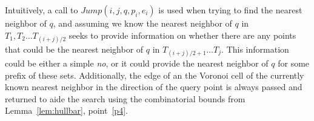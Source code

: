 \documentclass[12pt,a4paper,USenglish,cleveref, autoref, thm-restate]{article}
\newcommand{\ovar}[1]{\overrightarrow{#1}}
\newcommand{\Cell}{\mathit{Cell}}
\newcommand{\NN}{\mathit{NN}}
\newcommand{\john}[1]{\textcolor{red}{#1}}
\newcommand{\yakov}[1]{\textcolor{blue}{Yakov: #1}}
\newcommand{\ovar}[1]{\overrightarrow{#1}}
\newcommand{\Cell}{\mathit{Cell}}
\newcommand{\NN}{\mathit{NN}}
\newcommand{\john}[1]{\textcolor{red}{#1}}
\newcommand{\yakov}[1]{\textcolor{blue}{Yakov: #1}}
\newcommand{\ovar}[1]{\overrightarrow{#1}}
\newcommand{\Cell}{\mathit{Cell}}
\newcommand{\NN}{\mathit{NN}}
\newcommand{\john}[1]{\textcolor{red}{#1}}
\newcommand{\yakov}[1]{\textcolor{blue}{Yakov: #1}}
\begin{document}
Intuitively, a call to $Jump(i,j,q,p_i,e_i)$ is used when trying to find the nearest neighbor of $q$, and assuming we know the nearest neighbor of $q$ in $T_1, T_2 \ldots T_{(i+j)/2}$ seeks to provide information on whether there are any points that could be the nearest neighbor of $q$ in $T_{(i+j)/2+1} \ldots T_j$. This information could be either a simple \emph{no}, or it could provide the nearest neighbor of $q$ for some prefix of these sets. Additionally, the edge of an the Voronoi cell of the currently known nearest neighbor in the direction of the query point is always passed and returned to aide the search using the combinatorial bounds from Lemma~\ref{lem:hullbar}, point~\ref{p4}.
 
\newcommand{\jumpdef}{
\begin{itemize}
\setlength{\itemsep}{1pt}
\setlength{\parskip}{0pt}
\setlength{\parsep}{0pt} 
    \item \textbf{Input to $Jump(i,j,q,p_i,e_i)$}:
        \begin{itemize}
        \setlength{\itemsep}{1pt}
     \setlength{\parskip}{0pt}
    \setlength{\parsep}{0pt} 
        \item Integers $i$ and $j$, where $j-i$ is required to be a power of 2. We use $m$ to refer to $(j+i)/2$, the midpoint.  
        \item Query point $q$.
        \item Point $p_i$ where $p_i = \NN(T_i,q)$.
        \item The edge $e_i$ on the boundary of $\Cell(T_i,p_i)$ that the ray $\ovar{p_iq}$ intersects.
  \end{itemize}
    \item \textbf{Output}: Either one of two results, \emph{Failure} or a triple $(j',p_{j'},e_{j'})$
	\begin{itemize}
		\item If \emph{Failure}, this is a certificate that $\NN_{(m,\min(j,f)]}(q) \not = \NN_{[1,\min(j,f)]}(q)$
		\item If a triple $(j',p_{j'},e_{j'})$ is returned, it has the following properties:
    \begin{itemize}

\end{itemize}
\end{itemize}
\end{itemize}}
\end{document}
